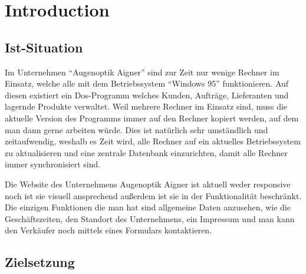 \chapter{Introduction}
\section{Ist-Situation}
Im Unternehmen “Augenoptik Aigner” sind zur Zeit nur wenige Rechner im Einsatz, welche alle mit dem Betriebssystem “Windows 95” funktionieren. Auf diesen existiert ein Dos-Programm welches Kunden,  Aufträge, Lieferanten und lagernde Produkte  verwaltet. Weil mehrere Rechner im Einsatz sind, muss die aktuelle Version des Programms immer auf den Rechner kopiert werden, auf dem man dann gerne arbeiten würde. Dies ist natürlich sehr umständlich und zeitaufwendig, weshalb es Zeit wird, alle Rechner auf ein aktuelles Betriebssystem zu aktualisieren und eine zentrale Datenbank einzurichten, damit alle Rechner immer synchronisiert sind.

Die Website des Unternehmens Augenoptik Aigner ist aktuell weder responsive noch ist sie visuell ansprechend außerdem ist sie in der Funktionalität beschränkt. Die einzigen Funktionen die man hat sind allgemeine Daten anzusehen, wie die Geschäftszeiten, den Standort des Unternehmens, ein Impressum und man kann den Verkäufer noch mittels eines Formulars kontaktieren. 

\section{Zielsetzung}




